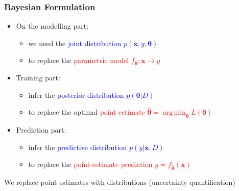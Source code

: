 \documentclass{beamer}
\newcommand{\thetab}{\boldsymbol{\theta}}
\newcommand{\xb}{\boldsymbol{x}}
\DeclareMathOperator*{\argmin}{arg\,min}
\begin{document}
\begin{frame}
  \frametitle{Bayesian Formulation}
  \begin{itemize}
    \item On the modelling part:
      \begin{itemize}
        \item we need the \textcolor{blue}{joint distribution \(p(\xb,y,\thetab)\)}
        \item to replace the \textcolor{red}{parametric model \(f_{\thetab}: \xb \rightarrow y\)}
      \end{itemize}

    \item Training part:
      \begin{itemize}
        \item infer the \textcolor{blue}{posterior distribution \(p(\thetab|D)\)}
        \item to replace the optimal \textcolor{red}{point estimate \(\hat{\thetab} = \argmin_{\thetab} L(\thetab)\)}
      \end{itemize}

    \item Prediction part:
      \begin{itemize}
        \item infer the \textcolor{blue}{predictive distribution \(p(y|\xb,D)\)}
        \item to replace the \textcolor{red}{point-estimate prediction \(y=f_{\hat{\thetab}}(\xb)\)}
      \end{itemize}
    \end{itemize}
    \noindent\makebox[\linewidth]{\rule{\paperwidth}{0.4pt}}
    We replace point estimates \alert{with distributions (uncertainty quantification)}

\end{frame}
\end{document}
